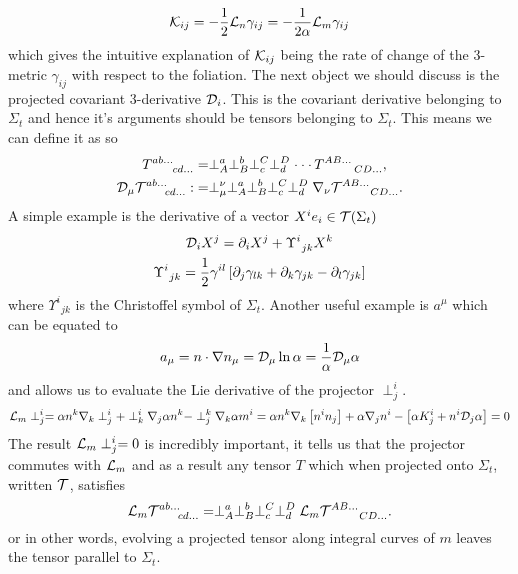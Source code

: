 \begin{equation} \mathcal{K}_{ij} = -\frac{1}{2}\mathcal{L}_n \gamma_{ij} = -\frac{1}{2\alpha}\mathcal{L}_m \gamma_{ij}\end{equation}
which gives the intuitive explanation of $\mathcal{K}_{ij}$ being the rate of change of the 3-metric $\gamma_{ij}$ with respect to the foliation. 
The next object we should discuss is the projected covariant 3-derivative $\mathcal{D}_i$. This is the covariant derivative belonging to $\Sigma_t$ and hence it's arguments should be tensors belonging to $\Sigma_t$. This means we can define it as so
\begin{align} {{T}}^{ab ...}_{\;\;\;\;\;\;\;cd ...} &=  \perp^{a}_{A}\perp^{b}_{B}\perp^{C}_{c}\perp^{D}_{d}\cdot\cdot\cdot\, T^{AB ...}_{\;\;\;\;\;\;\;\;\;\;CD ...},\\
  \mathcal{D}_\mu {{\mathcal{T}}}^{ab ...}_{\;\;\;\;\;\;\;cd ...} :&=   \perp^\nu_\mu  \perp^{a}_{A}\perp^{b}_{B}\perp^{C}_{c}\perp^{D}_{d} \nabla_\nu{\mathcal{T}}^{AB ...}_{\;\;\;\;\;\;\;\;\;\;CD ...}.\end{align}
A simple example is the derivative of a vector $X^i e_i \in \mathcal{T}(\Sigma_t)$
\begin{gather} \mathcal{D}_i X^j = \partial_i X^j + \Upsilon^i_{\;\,jk}X^k\nonumber\\
\Upsilon^i_{\;\,jk} = \frac{1}{2}\gamma^{il}\left[ \partial_{j}\gamma_{lk} + \partial_{k}\gamma_{jk} -\partial_{l}\gamma_{jk} \right]\end{gather}
where $\Upsilon^i_{\;\,jk}$ is the Christoffel symbol of $\Sigma_t$. Another useful example is $a^\mu$ which can be equated to
\[ a_\mu = n\cdot \nabla n_\mu = \mathcal{D}_\mu \ln \alpha = \frac{1}{\alpha}\mathcal{D}_\mu \alpha\]
and allows us to evaluate the Lie derivative of the projector $\perp^i_j$.
\begin{gather*}\mathcal{L}_m \perp^i_j = \alpha n^k \nabla_k \perp^i_j + \perp^i_k \nabla_j \alpha n^k - \perp^k_j \nabla_k \alpha m^i  = \alpha n^k \nabla_k \left[ n^i n_j\right]  + \alpha \nabla_j n^i - \left[ \alpha K_j^i + n^i \mathcal{D}_j \alpha\right] = 0\end{gather*}
The result $\mathcal{L}_m \perp^i_j=0$ is incredibly important, it tells us that the projector commutes with $\mathcal{L}_m$ and as a result any tensor $T$ which when projected onto $\Sigma_t$, written $\mathcal{T}$, satisfies
\begin{equation}  \mathcal{L}_m {{\mathcal{T}}}^{ab ...}_{\;\;\;\;\;\;\;cd ...} =   \perp^{a}_{A}\perp^{b}_{B}\perp^{C}_{c}\perp^{D}_{d}\mathcal{L}_m{\mathcal{T}}^{AB ...}_{\;\;\;\;\;\;\;\;\;\;CD ...}.\end{equation} 
or in other words, evolving a projected tensor along integral curves of $m$ leaves the tensor parallel to $\Sigma_t$.




